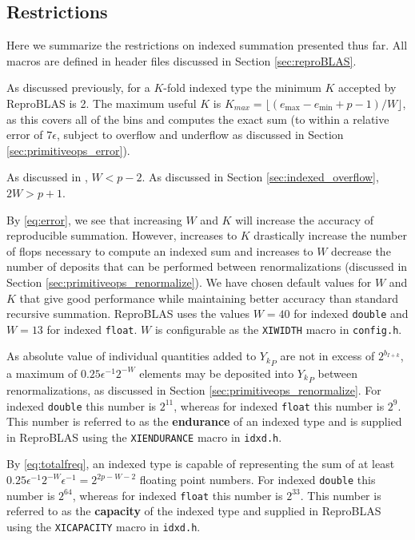 \subsection{Restrictions}
    \label{sec:primitiveops_restrictions}
    Here we summarize the restrictions on indexed summation presented thus far. All macros are defined in header files discussed in Section \ref{sec:reproBLAS}.

    As discussed previously, for a $K$-fold indexed type the minimum $K$
    accepted by ReproBLAS is 2. The maximum useful $K$ is
    $K_{max}=\lfloor(e_{\max} - e_{\min} + p - 1)/W\rfloor$,
    as this covers all of the bins and computes the exact sum (to within a relative error of $7 \epsilon$, subject to overflow and underflow as discussed in Section \ref{sec:primitiveops_error}).

    As discussed in \cite{repsum}, $W < p - 2$. As discussed in Section
    \ref{sec:indexed_overflow}, $2 W > p + 1$.

    By \eqref{eq:error}, we see that increasing $W$ and $K$ will increase
    the accuracy of reproducible summation. However, increases to $K$ drastically increase the number of flops necessary to compute an indexed sum and increases to $W$ decrease the number of deposits that can be performed between renormalizations (discussed in Section \ref{sec:primitiveops_renormalize}).
    We have chosen default values for $W$ and $K$ that give good performance while maintaining better accuracy than standard recursive summation.
    ReproBLAS uses the values $W = 40$ for indexed \texttt{double} and $W = 13$
    for indexed \texttt{float}. $W$ is configurable as the \texttt{XIWIDTH} macro in \texttt{config.h}.

    As absolute value of individual quantities added to ${Y_k}_P$ are not in
    excess of $2^{b_{I + k}}$, a maximum of $0.25\epsilon^{-1}2^{-W}$ elements
    may be deposited into ${Y_k}_P$ between renormalizations, as discussed in
    Section \ref{sec:primitiveops_renormalize}. For indexed \texttt{double}
    this number is $2^{11}$, whereas for indexed \texttt{float} this number is
    $2^9$. This number is referred to as the \textbf{endurance} of an indexed type and is supplied in ReproBLAS using the
    \texttt{XIENDURANCE} macro in \texttt{idxd.h}.

    By \eqref{eq:totalfreq}, an indexed type is capable of representing the sum
    of at least $0.25\epsilon^{-1}2^{-W}  \epsilon^{-1} = 2^{2  p - W - 2}$
    floating point numbers. For indexed \texttt{double} this number is
    $2^{64}$, whereas for indexed \texttt{float} this number is
    $2^{33}$. This number is referred to as the \textbf{capacity} of the indexed type and supplied in ReproBLAS using the
    \texttt{XICAPACITY} macro in \texttt{idxd.h}.

